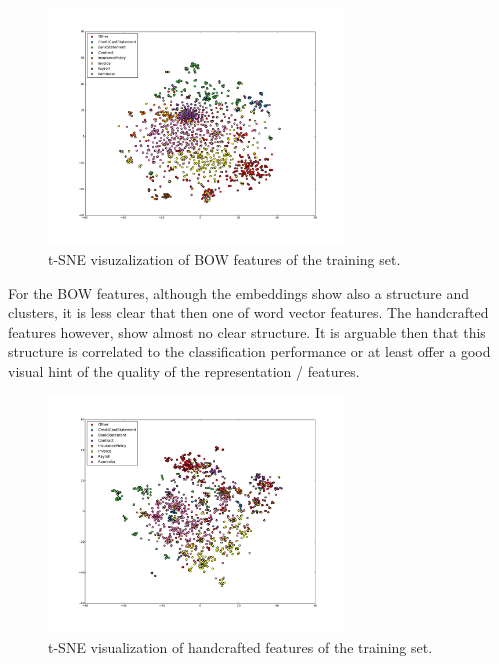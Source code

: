\begin{figure}[ht!]
	\begin{center}

			\includegraphics[width=0.7\textwidth]{images/tse-tfidf-vectors.png} 

	\end{center}
        \caption{\ac{t-SNE} visuzalization of \ac{BOW} features of the training set.  }

	\label{fig:tsne_viz_2}
\end{figure}
 
For the \ac{BOW} features, although the embeddings show also a  structure
and clusters, it  is less clear that then one of word vector features. The
handcrafted  features however, show almost no clear structure. It is arguable then that this
structure is correlated to the classification performance or at least offer a
good visual hint of the quality of the representation / features. 


\begin{figure}[hptb!]
	\begin{center}

			\includegraphics[width=0.7\textwidth]{images/tse-handcrafted-vectors.pdf} 

	\end{center}
        \caption{\ac{t-SNE} visualization of handcrafted features of the training set.}
	\label{fig:tsne_viz_3}
\end{figure}
 

